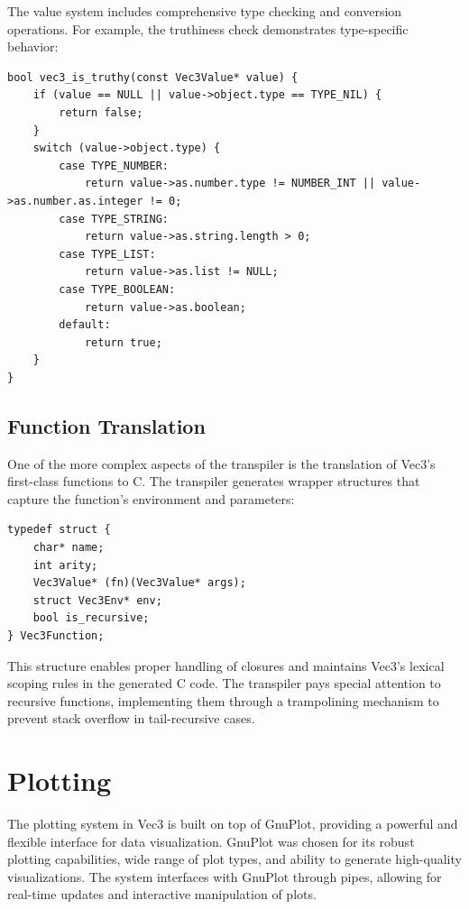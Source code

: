 The value system includes comprehensive type checking and conversion operations.
For example, the truthiness check demonstrates type-specific behavior:

\begin{verbatim}
bool vec3_is_truthy(const Vec3Value* value) {
    if (value == NULL || value->object.type == TYPE_NIL) {
        return false;
    }
    switch (value->object.type) {
        case TYPE_NUMBER:
            return value->as.number.type != NUMBER_INT || value->as.number.as.integer != 0;
        case TYPE_STRING:
            return value->as.string.length > 0;
        case TYPE_LIST:
            return value->as.list != NULL;
        case TYPE_BOOLEAN:
            return value->as.boolean;
        default:
            return true;
    }
}
\end{verbatim}

\subsection{Function Translation}\label{subsec:function-translation}

One of the more complex aspects of the transpiler is the translation of Vec3's first-class functions to C. The transpiler generates wrapper structures that capture the function's environment and parameters:

\begin{verbatim}
typedef struct {
    char* name;
    int arity;
    Vec3Value* (fn)(Vec3Value* args);
    struct Vec3Env* env;
    bool is_recursive;
} Vec3Function;
\end{verbatim}

This structure enables proper handling of closures and maintains Vec3's lexical scoping rules in the generated C code. 
The transpiler pays special attention to recursive functions, implementing them through a trampolining mechanism to prevent stack overflow in tail-recursive cases.

\section{Plotting}\label{sec:plotting}
The plotting system in Vec3 is built on top of GnuPlot, providing a powerful and flexible interface for data visualization. GnuPlot was chosen for its robust plotting capabilities, wide range of plot types, and ability to generate high-quality visualizations. The system interfaces with GnuPlot through pipes, allowing for real-time updates and interactive manipulation of plots.
